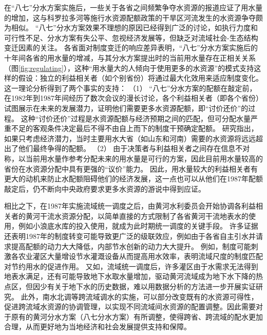 在“八七”分水方案实施后，一些关于各省之间频繁争夺水资源的报道应证了用水量的增加，这与科罗拉多河等施行水资源配额政策的干旱区河流发生的水资源争夺颇为相似\cite{grafton2013, schmandt2021a}。
“八七”分水方案效果不理想的原因已经得到广泛的讨论，如执行力度和可行性不足、分水方案有失公平、忽视经济发展等，但缺乏对流域社会-生态结构变迁因素的关注\cite{wang2019b,wang2019a}。
各省面对制度变迁的响应差异表明，“八七”分水方案实施后的十年间各省的用水量的增减，与其分水方案提出时的当前用水量存在正相关关系（图\ref{fig:regulating}），这种“用水量大的人倾向于使用更多的水资源”的模式支持这样的假设：独立的利益相关者（如个别省份）将通过最大化效用来适应制度变化。
这一理论分析得到了两个事实的支持：
（1） “八七”分水方案的配额在敲定前，在1982年到1987年间经历了数次会议的漫长讨论，各个利益相关者（即各个省份）试图展示在未来的发展潜力，证明他们需要更多水资源配额，即“讨价还价”的过程\cite{wang2019a, wang2019d}。
这种“讨价还价”过程是水资源配额与经济预期之间的匹配，但可分配水量严重不足的客观条件决定最后不得不由自上而下的制度干预确定配额。
研究指出，如果只考虑经济潜力，当时主要用水大省（如山东和河南）需要的水资源将远远超出了他们最终争得的配额\cite{zuo2020}。
（2） 由于决策者与利益相关者之间存在信息不对称，以当前用水量作参考分配未来的用水量是可行的方案，因此目前用水量较高的省份在水资源分配中具有更强的“议价”能力。
因此，用水量较大的利益相关者有更大的动机来防止水配额阻碍他们的经济发展，这一点也可以从他们在1987年配额敲定后，仍不断向中央政府要求更多水资源的游说中得到应证\cite{wang2019a, wang2019d}。


相比之下，在1987年实施流域统一调度之后，由黄河水利委员会开始协调各利益相关者的黄河干流水资源分配，以简单直接的方式限制了各省黄河干流地表水的使用，例如小浪底水库的投入使用，就成为此时期统一调度的关键手段。
许多证据还表明1987年的制度转变可能导致更广泛的级联效应，例如由于各省自主引水并请求提高配额的动力大大降低，内部节水创新的动力大大提升。
例如，制度可能刺激各农业灌区大量增设节水灌溉设备从而提高用水效率，表明流域尺度的制度匹配对节约用水的促进作用\cite{krieger1955, ostrom1990}。
又如，流域统一调度后，许多灌区由于水需求无法得到地表水满足，还有可能导致地下水取水量增加，驱动黄河流域成为地下水下降的热点区\cite{sun2022b}，但因少有关于地下水的历史数据，难以用数据分析的方法进一步开展实证研究。
此外，南水北调等跨流域调水的实施，可以部分改变既有的水资源可得性，促进跨流域水资源的协调管理，以实现不同流域间水资源的配置调整。因此需要对于原有的黄河分水方案（八七分水方案）有所调整，使得跨省、跨流域的配水更加合理，从而更好地为当地经济和社会发展提供支持和保障。

